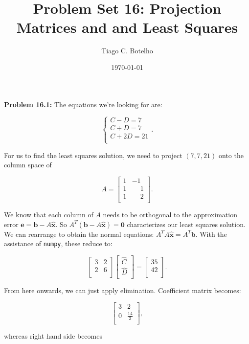 \documentclass{article}
\title{Problem Set 16: Projection Matrices and and Least Squares}
\author{Tiago C. Botelho}
\date{\today}
\begin{document}
\maketitle

\noindent \textbf{Problem 16.1:} The equations we're looking for are:

\[
\begin{cases}
C - D = 7\\
C + D = 7\\
C + 2D = 21\\
\end{cases}.
\]

For us to find the least squares solution, we need to project $(7, 7, 21)$ onto the column space of

\[
A = \begin{bmatrix}
1 & -1\\
1 & \phantom{-}1\\
1 & \phantom{-}2\\
\end{bmatrix}.
\]

We know that each column of $A$ needs to be orthogonal to the approximation error $\mathbf{e = b} - A\widehat{\mathbf{x}}$. So $A^{T}(\mathbf{b} - A\widehat{\mathbf{x}}) = \mathbf{0}$ characterizes our least squares solution. We can rearrange to obtain the normal equations: $A^{T}A\widehat{\mathbf{x}} = A^{T}\mathbf{b}$. With the assistance of \texttt{numpy}, these reduce to:

\[
\begin{bmatrix}
3 & 2\\
2 & 6\\
\end{bmatrix}
\begin{bmatrix}
\widehat{C}\\
\widehat{D}\\
\end{bmatrix}
=
\begin{bmatrix}
35\\
42\\
\end{bmatrix}.
\]

From here onwards, we can just apply elimination. Coefficient matrix becomes:

\[
\begin{bmatrix}
3 & 2\\
0 & \frac{14}{3}\\
\end{bmatrix},
\]

whereas right hand side becomes
\end{document}
